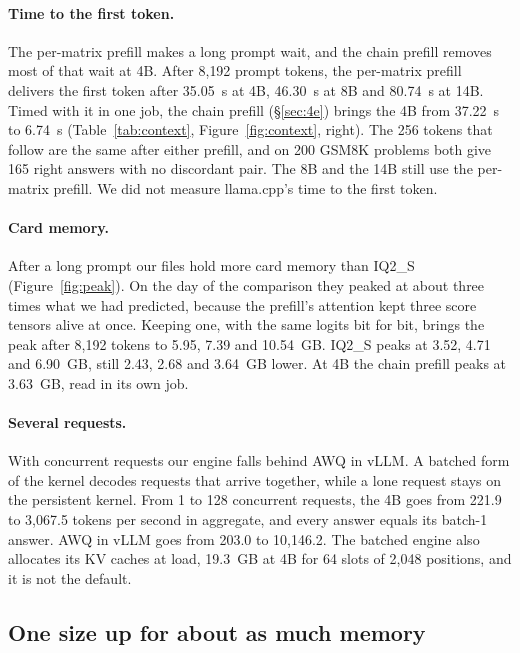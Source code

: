 \paragraph{Time to the first token.} The per-matrix prefill makes a long
prompt wait, and the chain prefill removes most of that wait at 4B. After
8{,}192 prompt tokens, the per-matrix prefill delivers the first token after
35.05~s at 4B, 46.30~s at 8B and 80.74~s at 14B. Timed with it in one job, the
chain prefill (\S\ref{sec:4e}) brings the 4B from 37.22~s to 6.74~s
(Table~\ref{tab:context}, Figure~\ref{fig:context}, right). The 256 tokens
that follow are the same after either prefill, and on 200 GSM8K problems both
give 165 right answers with no discordant pair. The 8B and the 14B still use
the per-matrix prefill. We did not measure llama.cpp's time to the first
token.

\paragraph{Card memory.} After a long prompt our files hold more card memory
than IQ2\_S (Figure~\ref{fig:peak}). On the day of the comparison they peaked
at about three times what we had predicted, because the prefill's attention
kept three score tensors alive at once. Keeping one, with the same logits bit
for bit, brings the peak after 8{,}192 tokens to 5.95, 7.39 and 10.54~GB.
IQ2\_S peaks at 3.52, 4.71 and 6.90~GB, still 2.43, 2.68 and 3.64~GB lower. At
4B the chain prefill peaks at 3.63~GB, read in its own job.

\paragraph{Several requests.} With concurrent requests our engine falls behind
AWQ in vLLM. A batched form of the kernel decodes requests that arrive
together, while a lone request stays on the persistent kernel. From 1 to 128
concurrent requests, the 4B goes from 221.9 to 3{,}067.5 tokens per second in
aggregate, and every answer equals its batch-1 answer. AWQ in vLLM goes from
203.0 to 10{,}146.2. The batched engine also allocates its KV caches at load,
19.3~GB at 4B for 64 slots of 2{,}048 positions, and it is not the default.

\subsection{One size up for about as much memory}
\label{sec:sizeup}

